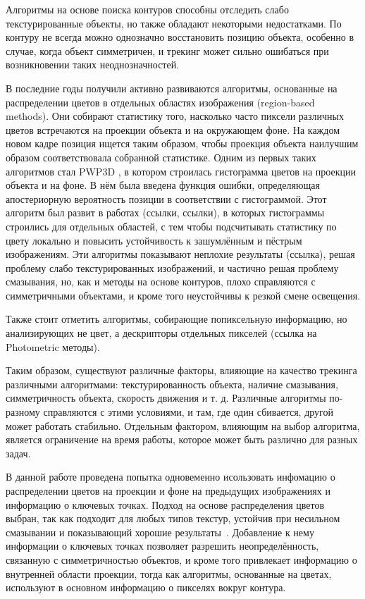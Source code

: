 
Алгоритмы на основе поиска контуров способны отследить слабо текстурированные
объекты, но также обладают некоторыми недостатками.
По контуру не всегда можно однозначно восстановить позицию объекта, особенно в
случае, когда объект симметричен, и трекинг может сильно ошибаться при
возникновении таких неоднозначностей.

В последние годы получили активно развиваются алгоритмы, основанные на
распределении цветов в отдельных областях изображения (region-based methods).
Они собирают статистику того, насколько часто пиксели различных цветов
встречаются на проекции объекта и на окружающем фоне.
На каждом новом кадре позиция ищется таким образом, чтобы проекция объекта
наилучшим образом соответствовала собранной статистике.
Одним из первых таких алгоритмов стал PWP3D \cite{PWP3D}, в котором строилась
гистограмма цветов на проекции объекта и на фоне.
В нём была введена функция ошибки, определяющая апостериорную вероятность
позиции в соответствии с гистограммой.
Этот алгоритм был развит в работах (ссылки, ссылки), в которых гистограммы
строились для отдельных областей, с тем чтобы подсчитывать статистику по цвету
локально и повысить устойчивость к зашумлённым и пёстрым изображениям.
Эти алгоритмы показывают неплохие результаты (ссылка), решая проблему слабо
текстурированных изображений, и частично решая проблему смазывания, но, как и
методы на основе контуров, плохо справляются с симметричными объектами, и кроме
того неустойчивы к резкой смене освещения.

Также стоит отметить алгоритмы, собирающие попиксельную информацию, но
анализирующих не цвет, а дескрипторы отдельных пикселей (ссылка на Photometric
методы).

Таким образом, существуют различные факторы, влияющие на качество трекинга
различными алгоритмами: текстурированность объекта, наличие смазывания,
симметричность объекта, скорость движения и т. д.
Различные алгоритмы по-разному справляются с этими условиями, и там, где один
сбивается, другой может работать стабильно.
Отдельным фактором, влияющим на выбор алгоритма, является ограничение на время
работы, которое может быть различно для разных задач.

В данной работе проведена попытка одновеменно исользовать инфомацию о
распределении цветов на проекции и фоне на предыдущих изображениях и информацию
о ключевых точках.
Подход на основе распределения цветов выбран, так как подходит для любых типов
текстур, устойчив при несильном смазывании и показывающий хорошие
результаты~\cite{Tjaden2018}.
Добавление к нему информации о ключевых точках позволяет разрешить
неопределённость, связанную с симметричностью объектов, и кроме того привлекает
информацию о внутренней области проекции, тогда как алгоритмы, основанные на
цветах, используют в основном информацию о пикселях вокруг контура.

